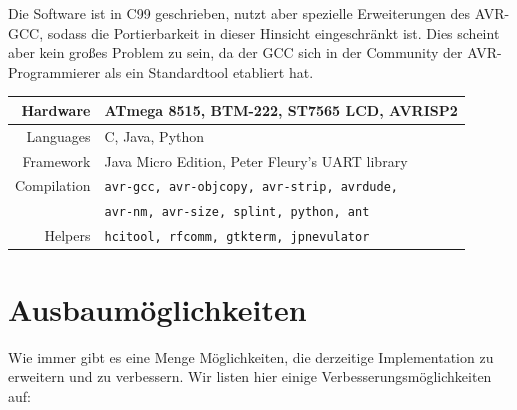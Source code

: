 \documentclass[ngerman]{article}
\begin{document}
Die Software ist in C99 geschrieben, nutzt aber spezielle Erweiterungen des
AVR-GCC, sodass die Portierbarkeit in dieser Hinsicht eingeschränkt ist. Dies
scheint aber kein großes Problem zu sein, da der GCC sich in der Community der
AVR-Programmierer als ein Standardtool etabliert hat.

    \begin{tabular}{|r||l|}
        \hline
        Hardware & ATmega 8515, BTM-222, ST7565 LCD, AVRISP2 \\
        \hline
        Languages & C, Java, Python\\
        \hline
        Framework & Java Micro Edition, Peter Fleury's UART library\\
        \hline
        Compilation & {\tt avr-gcc, avr-objcopy, avr-strip, avrdude,} \\
                    & {\tt avr-nm, avr-size, splint, python, ant} \\
        \hline
        Helpers & {\tt hcitool, rfcomm, gtkterm, jpnevulator} \\
        \hline
    \end{tabular}



\section{Ausbaumöglichkeiten}

Wie immer gibt es eine Menge Möglichkeiten, die derzeitige Implementation zu
erweitern und zu verbessern. Wir listen hier einige Verbesserungsmöglichkeiten
auf:
\end{document}
